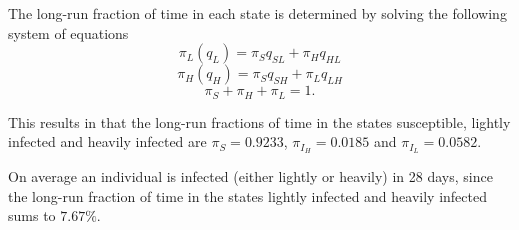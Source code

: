 The long-run fraction of time in each state is determined by solving the following system of equations
$$ \pi_L(q_L) = \pi_S q_{SL} + \pi_H q_{HL}$$
$$ \pi_H(q_H) = \pi_S q_{SH} + \pi_L q_{LH}$$
$$ \pi_S + \pi_H +\pi_L = 1 .$$

This results in that the long-run fractions of time in the states susceptible, lightly infected and heavily infected are $\pi_S = 0.9233$, $\pi_{I_H} = 0.0185$ and $\pi_{I_L} = 0.0582$. 

On average an individual is infected (either lightly or heavily) in 28 days, since the long-run fraction of time in the states lightly infected and heavily infected sums to $7.67\%$.

